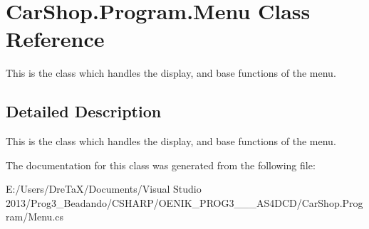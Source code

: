 \hypertarget{class_car_shop_1_1_program_1_1_menu}{}\section{Car\+Shop.\+Program.\+Menu Class Reference}
\label{class_car_shop_1_1_program_1_1_menu}


This is the class which handles the display, and base functions of the menu.  




\subsection{Detailed Description}
This is the class which handles the display, and base functions of the menu. 



The documentation for this class was generated from the following file\+:\begin{DoxyCompactItemize}
\item 
E\+:/\+Users/\+Dre\+Ta\+X/\+Documents/\+Visual Studio 2013/\+Prog3\+\_\+\+Beadando/\+C\+S\+H\+A\+R\+P/\+O\+E\+N\+I\+K\+\_\+\+P\+R\+O\+G3\+\_\+\_\+\_\+\+A\+S4\+D\+C\+D/\+Car\+Shop.\+Program/Menu.\+cs\end{DoxyCompactItemize}
